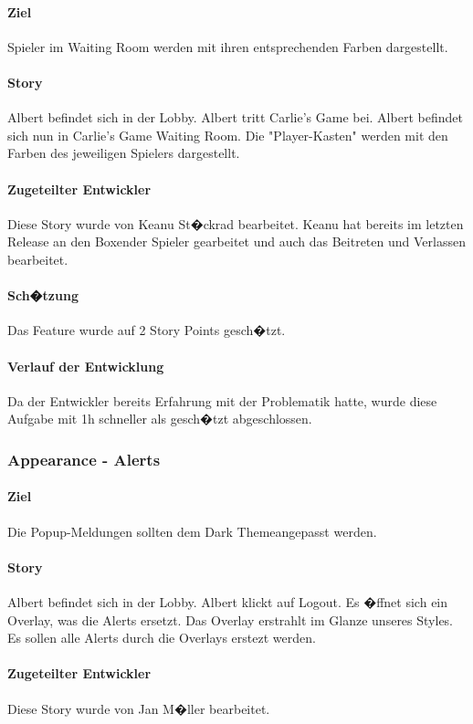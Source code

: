 \documentclass[12pt, titlepage]{scrartcl}
\begin{document}
			\paragraph{Ziel} Spieler im Waiting Room werden mit ihren entsprechenden Farben dargestellt.
			\paragraph{Story} Albert befindet sich in der Lobby. Albert tritt Carlie's Game bei. Albert befindet sich nun in Carlie's Game Waiting Room. Die "Player-Kasten" werden mit den Farben des jeweiligen Spielers dargestellt.
			\paragraph{Zugeteilter Entwickler} Diese Story wurde von Keanu St�ckrad bearbeitet. Keanu hat bereits im letzten Release an den \glqq Boxen\grqq der Spieler gearbeitet und auch das Beitreten und Verlassen bearbeitet.
			\paragraph{Sch�tzung}
			Das Feature wurde auf 2 Story Points gesch�tzt.
			\paragraph{Verlauf der Entwicklung} 
			Da der Entwickler bereits Erfahrung mit der Problematik hatte, wurde diese Aufgabe mit 1h schneller als gesch�tzt abgeschlossen.
			
			\subsubsection{Appearance - Alerts}
			\paragraph{Ziel} Die Popup-Meldungen sollten dem \glqq Dark Theme\grqq angepasst werden.
			\paragraph{Story} Albert befindet sich in der Lobby. Albert klickt auf Logout. Es �ffnet sich ein Overlay, was die Alerts ersetzt. Das Overlay erstrahlt im Glanze unseres Styles. Es sollen alle Alerts durch die Overlays erstezt werden.
			\paragraph{Zugeteilter Entwickler} Diese Story wurde von Jan M�ller bearbeitet. 
\end{document}
